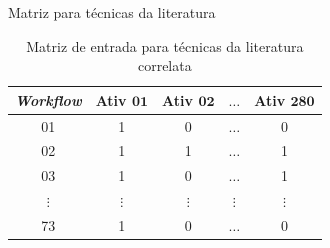 \begin{frame}		
	\begin{block}{Matriz para técnicas da literatura}
		\begin{table}[htb]
			\centering
			\begin{tabular}{|c|c|c|c|c|}  \hline
				\textbf{\emph{Workflow}} & \textbf{Ativ \(\mathbf{01}\)} & \textbf{Ativ \(\mathbf{02}\)} & \textbf{\(\mathbf{\ldots}\)} & \textbf{Ativ \(\mathbf{280}\)}  \\ \hline
				01 			  & 1 			  & 0 			  & \(\ldots\) 	  & 0  				\\ \hline
				02 			  & 1 			  & 1 			  & \(\ldots\) 	  & 1  				\\ \hline
				03 			  & 1 			  & 0 			  & \(\ldots\) 	  & 1  				\\ \hline
				\(\vdots\) 		  			  & \(\vdots\) 	  & \(\vdots\) 	  & \(\vdots\) 	  & \(\vdots\) 		\\ \hline
				73 			  & 1 			  & 0 			  & \(\ldots\) 	  & 0  				\\ \hline
			\end{tabular}
			\caption{Matriz de entrada para técnicas da literatura correlata}
			\label{tabela_matriz_de_dados}
		\end{table}
	\end{block}
\end{frame}


